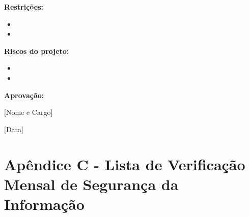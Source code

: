 \documentclass[12pt,a4paper]{report}
\begin{document}
\begin{tcolorbox}[colback=boxcolor,colframe=sectioncolor,arc=2mm,title=\textbf{PLANO DE AÇÃO PARA IMPLEMENTAÇÃO DO SGSI}]
\textbf{Restrições:}
\begin{itemize}
  \item 
  \item 
\end{itemize}

\textbf{Riscos do projeto:}
\begin{itemize}
  \item 
  \item 
\end{itemize}

\textbf{Aprovação:}

\hspace{8cm} [Nome e Cargo]

\hspace{8cm} [Data]
\end{tcolorbox}

\section{Apêndice C - Lista de Verificação Mensal de Segurança da Informação}
\end{document}
